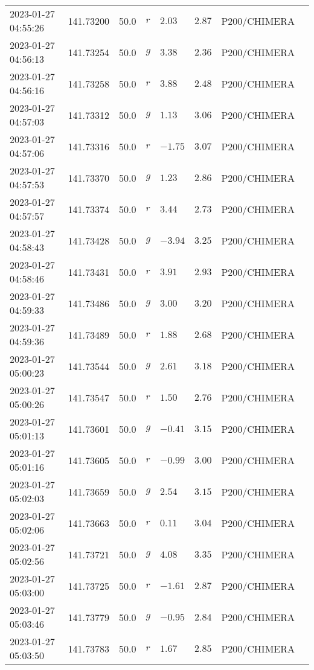 \documentclass{nature_plusfigure}
\begin{document}
\begin{supplement}
\begin{center}
\begin{longtable}{llllllll}
2023-01-27 04:55:26 & 141.73200 & 50.0 & $r$ & $2.03$ & $2.87$ & P200/CHIMERA &  \\ 
2023-01-27 04:56:13 & 141.73254 & 50.0 & $g$ & $3.38$ & $2.36$ & P200/CHIMERA &  \\ 
2023-01-27 04:56:16 & 141.73258 & 50.0 & $r$ & $3.88$ & $2.48$ & P200/CHIMERA &  \\ 
2023-01-27 04:57:03 & 141.73312 & 50.0 & $g$ & $1.13$ & $3.06$ & P200/CHIMERA &  \\ 
2023-01-27 04:57:06 & 141.73316 & 50.0 & $r$ & $-1.75$ & $3.07$ & P200/CHIMERA &  \\ 
2023-01-27 04:57:53 & 141.73370 & 50.0 & $g$ & $1.23$ & $2.86$ & P200/CHIMERA &  \\ 
2023-01-27 04:57:57 & 141.73374 & 50.0 & $r$ & $3.44$ & $2.73$ & P200/CHIMERA &  \\ 
2023-01-27 04:58:43 & 141.73428 & 50.0 & $g$ & $-3.94$ & $3.25$ & P200/CHIMERA &  \\ 
2023-01-27 04:58:46 & 141.73431 & 50.0 & $r$ & $3.91$ & $2.93$ & P200/CHIMERA &  \\ 
2023-01-27 04:59:33 & 141.73486 & 50.0 & $g$ & $3.00$ & $3.20$ & P200/CHIMERA &  \\ 
2023-01-27 04:59:36 & 141.73489 & 50.0 & $r$ & $1.88$ & $2.68$ & P200/CHIMERA &  \\ 
2023-01-27 05:00:23 & 141.73544 & 50.0 & $g$ & $2.61$ & $3.18$ & P200/CHIMERA &  \\ 
2023-01-27 05:00:26 & 141.73547 & 50.0 & $r$ & $1.50$ & $2.76$ & P200/CHIMERA &  \\ 
2023-01-27 05:01:13 & 141.73601 & 50.0 & $g$ & $-0.41$ & $3.15$ & P200/CHIMERA &  \\ 
2023-01-27 05:01:16 & 141.73605 & 50.0 & $r$ & $-0.99$ & $3.00$ & P200/CHIMERA &  \\ 
2023-01-27 05:02:03 & 141.73659 & 50.0 & $g$ & $2.54$ & $3.15$ & P200/CHIMERA &  \\ 
2023-01-27 05:02:06 & 141.73663 & 50.0 & $r$ & $0.11$ & $3.04$ & P200/CHIMERA &  \\ 
2023-01-27 05:02:56 & 141.73721 & 50.0 & $g$ & $4.08$ & $3.35$ & P200/CHIMERA &  \\ 
2023-01-27 05:03:00 & 141.73725 & 50.0 & $r$ & $-1.61$ & $2.87$ & P200/CHIMERA &  \\ 
2023-01-27 05:03:46 & 141.73779 & 50.0 & $g$ & $-0.95$ & $2.84$ & P200/CHIMERA &  \\ 
2023-01-27 05:03:50 & 141.73783 & 50.0 & $r$ & $1.67$ & $2.85$ & P200/CHIMERA &  \\ 

\end{longtable}
\end{center}
\end{supplement}
\end{document}
